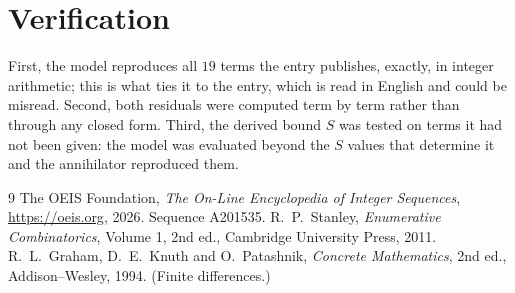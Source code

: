 \documentclass[11pt,a4paper]{article}
\theoremstyle{plain}
\theoremstyle{definition}
\begin{document}
\section{Verification}

First, the model reproduces all $19$ terms the entry publishes, exactly, in integer
arithmetic; this is what ties it to the entry, which is read in English and could be misread.
Second, both residuals were computed term by term rather than through any closed form. Third,
the derived bound $S$ was tested on terms it had not been given: the model was evaluated beyond
the $S$ values that determine it and the annihilator reproduced them.

\begin{thebibliography}{9}
 The OEIS Foundation, \emph{The On-Line Encyclopedia of Integer Sequences},
\url{https://oeis.org}, 2026. Sequence A201535.
 R.~P.~Stanley, \emph{Enumerative Combinatorics}, Volume 1, 2nd ed.,
Cambridge University Press, 2011.
 R.~L.~Graham, D.~E.~Knuth and O.~Patashnik, \emph{Concrete Mathematics},
2nd ed., Addison--Wesley, 1994. (Finite differences.)
\end{thebibliography}
\end{document}
